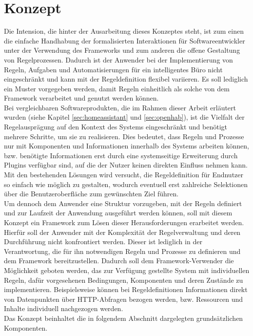 \section{Konzept}
\label{sec:concept}
    Die Intension, die hinter der Ausarbeitung dieses Konzeptes steht, ist zum einen die einfache Handhabung der 
    formalisierten Interaktionen für Softwareentwickler %
    unter der Verwendung des Frameworks und zum anderen die 
    offene Gestaltung von Regelprozessen. Dadurch ist der Anwender bei der Implementierung von Regeln, Aufgaben und Automatisierungen 
    für ein intelligentes Büro nicht eingeschränkt und kann mit der Regeldefinition flexibel variieren.
    Es soll lediglich ein Muster vorgegeben werden, damit Regeln einheitlich als solche von dem Framework 
    verarbeitet und genutzt werden können. 
    \\ 
    \linebreak
    Bei vergleichbaren Softwareprodukten, die im Rahmen dieser Arbeit erläutert 
    wurden (siehe Kapitel \ref{sec:homeassistant} und \ref{sec:openhab}), ist die Vielfalt der Regelausprägung auf 
    den Kontext des Systems eingeschränkt und benötigt mehrere Schritte, um sie zu realisieren. Dies bedeutet, dass 
    Regeln und Prozesse nur mit Komponenten und Informationen innerhalb des Systems arbeiten können, bzw. benötigte 
    Informationen erst durch eine systemseitige Erweiterung durch Plugins verfügbar sind, auf die der Nutzer keinen direkten 
    Einfluss nehmen kann. Mit den bestehenden Lösungen wird versucht, die Regeldefinition für Endnutzer so 
    einfach wie möglich zu gestalten, wodurch eventuell erst zahlreiche Selektionen über die Benutzeroberfläche zum gewünschten Ziel führen.   
    \\
    \linebreak
    Um dennoch dem Anwender eine Struktur vorzugeben, mit der Regeln definiert und zur Laufzeit der Anwendung ausgeführt 
    werden können, soll mit diesem Konzept ein Framework zum Lösen dieser Herausforderungen erarbeitet werden. Hierfür soll 
    der Anwender mit der Komplexität der Regelverwaltung und deren Durchführung nicht konfrontiert werden. Dieser ist lediglich 
    in der Verantwortung, die für ihn notwendigen Regeln und Prozesse zu definieren und dem Framework bereitzustellen. 
    Dadurch soll dem Framework-Verwender die Möglichkeit geboten werden, das zur Verfügung gestellte System 
    mit individuellen Regeln, dafür vorgesehenen Bedingungen, Komponenten und deren Zustände zu implementieren. Beispielsweise 
    können bei Regeldefinitionen Informationen direkt von Datenpunkten über \acs{HTTP}-Abfragen bezogen werden, bzw. Ressourcen 
    und Inhalte individuell nachgezogen werden.
    \\ 
    Das Konzept beinhaltet die in folgendem Abschnitt dargelegten grundsätzlichen Komponenten. %

